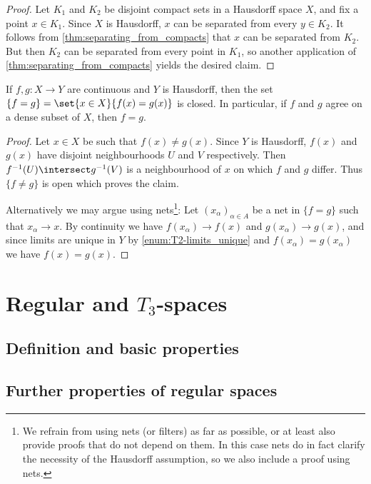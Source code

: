 \documentclass[article, a4paper, 11pt, oneside]{memoir}
\numberwithin{equation}{chapter}
\newcommand{\preim}{^{-1}}
\begin{document}
\begin{proof}
    Let $K_1$ and $K_2$ be disjoint compact sets in a Hausdorff space $X$, and fix a point $x \in K_1$. Since $X$ is Hausdorff, $x$ can be separated from every $y \in K_2$. It follows from \cref{thm:separating_from_compacts} that $x$ can be separated from $K_2$. But then $K_2$ can be separated from every point in $K_1$, so another application of \cref{thm:separating_from_compacts} yields the desired claim.
\end{proof}


\begin{proposition}
    If $f,g \colon X \to Y$ are continuous and $Y$ is Hausdorff, then the set $\{f = g\} = \set{x \in X}{f(x) = g(x)}$ is closed. In particular, if $f$ and $g$ agree on a dense subset of $X$, then $f = g$.
\end{proposition}

\begin{proof}
    Let $x \in X$ be such that $f(x) \neq g(x)$. Since $Y$ is Hausdorff, $f(x)$ and $g(x)$ have disjoint neighbourhoods $U$ and $V$ respectively. Then $f\preim(U) \intersect g\preim(V)$ is a neighbourhood of $x$ on which $f$ and $g$ differ. Thus $\{f \neq g\}$ is open which proves the claim.

    Alternatively we may argue using nets\footnote{We refrain from using nets (or filters) as far as possible, or at least also provide proofs that do not depend on them. In this case nets do in fact clarify the necessity of the Hausdorff assumption, so we also include a proof using nets.}: Let $(x_\alpha)_{\alpha \in A}$ be a net in $\{f = g\}$ such that $x_\alpha \to x$. By continuity we have $f(x_\alpha) \to f(x)$ and $g(x_\alpha) \to g(x)$, and since limits are unique in $Y$ by \cref{enum:T2-limits_unique} and $f(x_\alpha) = g(x_\alpha)$ we have $f(x) = g(x)$.
\end{proof}



\chapter[Regular and T3-spaces]{Regular and $T_3$-spaces}

\section{Definition and basic properties}

\section{Further properties of regular spaces}
\end{document}
